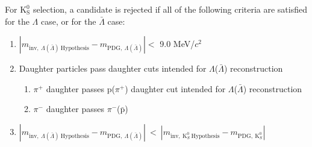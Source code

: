\documentclass[ALICE,manyauthors]{cernphprep}
\newcommand{\Lam}{$\Lambda$\xspace}
\newcommand{\ALam}{$\bar{\Lambda}$\xspace}
\newcommand{\LamALam}{$\Lambda$($\bar{\Lambda}$)\xspace}
\newcommand{\Ks}{$\mathrm{K^{0}_{S}}$\xspace}
\begin{document}
For \Ks selection, a candidate is rejected if all of the following criteria are satisfied for the \Lam case, or for the \ALam case:

\begin{enumerate}
 \item $\left|m_{\mathrm{inv}, \ \Lambda(\bar{\Lambda}) \ \mathrm{Hypothesis}} - m_{\mathrm{PDG},\ \Lambda(\bar{\Lambda})}\right| < $ 9.0 MeV/$c^{2}$
 \item Daughter particles pass daughter cuts intended for \LamALam reconstruction
 \begin{enumerate}
  \item $\pi^{+}$ daughter passes p($\pi^{+}$) daughter cut intended for \LamALam reconstruction
  \item $\pi^{-}$ daughter passes $\pi^{-}$($\bar{\mathrm{p}}$)
 \end{enumerate}
 \item $\left|m_{\mathrm{inv}, \ \Lambda(\bar{\Lambda}) \ \mathrm{Hypothesis}} - m_{\mathrm{PDG},\ \Lambda(\bar{\Lambda})}\right|~ < ~\left|m_{\mathrm{inv},~ \mathrm{K}^{0}_{S}~ \mathrm{Hypothesis}} - m_{\mathrm{PDG},~ \mathrm{K}^{0}_{S}}\right|$
\end{enumerate} 
\end{document}

